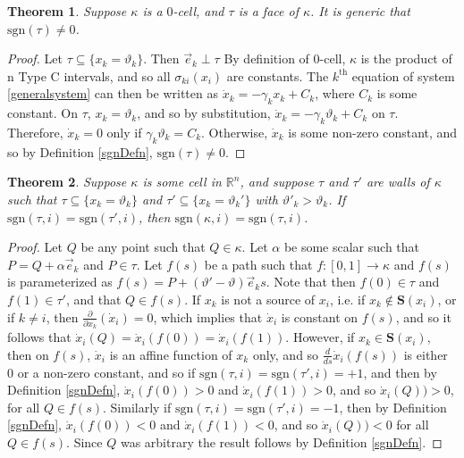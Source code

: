 \documentclass[12pt]{article}
\newtheorem{theorem}{Theorem}[section]
\theoremstyle{definition}
\theoremstyle{remark}
\newcommand\sgn{\text{sgn}}
\begin{document}
\begin{theorem} \label{0cellsdefined}
Suppose $\kappa$ is a  $0$-cell, and $\tau$ is a face of $\kappa$. It is generic that $\sgn(\tau)\neq 0$.
\end{theorem}

\begin{proof}
Let $\tau\subseteq \{x_k=\vartheta_k\}$. Then $\vec{e}_k\perp \tau$ By definition of  $0$-cell, $\kappa$ is the product of n Type C intervals, and so all $\sigma_{ki}(x_i)$ are constants. The $k^\text{th}$ equation of system \eqref{generalsystem} can then be written as $\dot x_k=-\gamma_kx_k+C_k$, where $C_k$ is some constant. On $\tau$, $x_k=\vartheta_k$, and so by substitution, $\dot x_k = -\gamma_k \vartheta_k + C_k$ on $\tau$. Therefore, $\dot{x}_k=0$ only if $\gamma_k\vartheta_k=C_k$. Otherwise, $\dot{x}_k$ is some non-zero constant, and so by Definition \ref{sgnDefn}, $\sgn(\tau)\neq 0$.
\end{proof}

\begin{theorem} \label{straightlineproof}
Suppose $\kappa$ is some cell in $\mathbb{R}^n$, and suppose $\tau$ and $\tau'$ are walls of $\kappa$ such that $\tau \subseteq \{x_k=\vartheta_k\}$ and $\tau' \subseteq \{x_k=\vartheta_k'\}$ with $\vartheta'_k > \vartheta_k$. If $\sgn(\tau,i)=\sgn(\tau',i)$, then $\sgn(\kappa,i)=\sgn(\tau,i)$.
\end{theorem}

\begin{proof}
Let $Q$ be any point such that $Q\in\kappa$. Let $\alpha$ be some scalar such that $P=Q +\alpha \vec e_k $ and $P \in \tau$. Let $f(s)$ be a path such that $f:[0,1]\to\kappa$ and $f(s)$ is parameterized as $f(s)=  P + (\vartheta'-\vartheta)\vec e_ks$.  Note that then $f(0) \in \tau$ and $f(1) \in \tau'$, and that $Q\in f(s)$. If $x_k$ is not a source of $x_i$, i.e. if $x_k \notin \mathbf{S}(x_i)$, or if $k\neq i$, then $\frac{\partial}{\partial x_k}(\dot x_i)=0$, which implies that $\dot x_i$ is constant on $f(s)$, and so it follows that $\dot x_i (Q)=\dot x_i (f(0))=\dot x_i (f(1))$. However, if $x_k \in \mathbf{S}(x_i)$, then on $f(s)$, $\dot x_i$ is an affine function of $x_k$ only, and so $\frac{d}{ds}\dot x_i(f(s))$ is either $0$ or a non-zero constant, and so if $\sgn(\tau,i)=\sgn(\tau',i)=+1$, and then by Definition \ref{sgnDefn}, $\dot x_i (f(0))>0$ and $\dot x_i (f(1))>0$, and so $\dot x_i (Q))>0$, for all $Q\in f(s)$. Similarly if $\sgn(\tau,i)=\sgn(\tau',i)=-1$, then by Definition \ref{sgnDefn}, $\dot x_i (f(0))<0$ and $\dot x_i (f(1))<0$, and so $\dot x_i (Q))<0$ for all $Q\in f(s)$. Since $Q$ was arbitrary the result follows by Definition \ref{sgnDefn}.
\end{proof}
\end{document}
